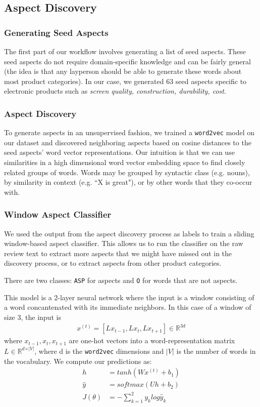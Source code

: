 \documentclass{article} %
\begin{document}
\subsection{Aspect Discovery}

\subsubsection{Generating Seed Aspects}
The first part of our workflow involves generating a list of seed aspects. These seed aspects do not require domain-specific knowledge and can be fairly general (the idea is that any layperson should be able to generate these words about most product categories). In our case, we generated 63 seed aspects specific to electronic products such as \textit{screen quality, construction, durability, cost}. 

\subsubsection{Aspect Discovery}
To generate aspects in an unsupervised fashion, we trained a \texttt{word2vec} model on our dataset and discovered neighboring aspects based on cosine distances to the seed aspects' word vector representations. Our intuition is that we can use similarities in a high dimensional word vector embedding space to find closely related groups of words. Words may be grouped by syntactic class (e.g. nouns), by similarity in context (e.g. ``X is great"), or by other words that they co-occur with.

\subsubsection{Window Aspect Classifier}
We used the output from the aspect discovery process as labels to train a sliding window-based aspect classifier. This allows us to run the classifier on the raw review text to extract more aspects that we might have missed out in the discovery process, or to extract aspects from other product categories.

There are two classes: \texttt{ASP} for aspects and \texttt{O} for words that are not aspects.

This model is a 2-layer neural network where the input is a window consisting of a word concantenated with its immediate neighbors. In this case of a window of size 3, the input is
\begin{align}
x^{(t)} = [ L x_{t-1}, L x_t, L x_{t+1} ] \in \mathbb{R}^{3d}
\end{align}
where $x_{t-1}, x_t, x_{t+1}$ are one-hot vectors into a word-representation matrix $L \in \mathbb{R}^{d \times \vert V \vert}$, where d is the \texttt{word2vec} dimensions and $\vert V \vert$ is the number of words in the vocabulary. We compute our predictions as:
\begin{align}
h &= tanh(W x^{(t)} + b_1)\\
\hat{y} &= softmax (Uh + b_2)\\
J(\theta) &= -\sum_{k=1}^{2} y_k log \hat{y}_k
\end{align}
\end{document}
